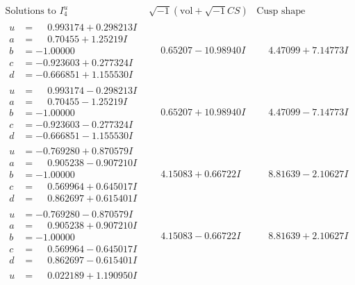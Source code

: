 \documentclass[1p]{elsarticle_modified}
\theoremstyle{definition}
\newcommand{\I}{\sqrt{-1}}
\begin{document}
$$\begin{array}{c|c|c}  
\text{Solutions to }I^u_{4}& \I (\text{vol} + \sqrt{-1}CS) & \text{Cusp shape}\\
 \hline 
\begin{aligned}
u &= \phantom{-}0.993174 + 0.298213 I \\
a &= \phantom{-}0.70455 + 1.25219 I \\
b &= -1.00000\phantom{ +0.000000I} \\
c &= -0.923603 + 0.277324 I \\
d &= -0.666851 + 1.155530 I\end{aligned}
 & \phantom{-}0.65207 - 10.98940 I & \phantom{-}4.47099 + 7.14773 I \\ \hline\begin{aligned}
u &= \phantom{-}0.993174 - 0.298213 I \\
a &= \phantom{-}0.70455 - 1.25219 I \\
b &= -1.00000\phantom{ +0.000000I} \\
c &= -0.923603 - 0.277324 I \\
d &= -0.666851 - 1.155530 I\end{aligned}
 & \phantom{-}0.65207 + 10.98940 I & \phantom{-}4.47099 - 7.14773 I \\ \hline\begin{aligned}
u &= -0.769280 + 0.870579 I \\
a &= \phantom{-}0.905238 - 0.907210 I \\
b &= -1.00000\phantom{ +0.000000I} \\
c &= \phantom{-}0.569964 + 0.645017 I \\
d &= \phantom{-}0.862697 + 0.615401 I\end{aligned}
 & \phantom{-}4.15083 + 0.66722 I & \phantom{-}8.81639 - 2.10627 I \\ \hline\begin{aligned}
u &= -0.769280 - 0.870579 I \\
a &= \phantom{-}0.905238 + 0.907210 I \\
b &= -1.00000\phantom{ +0.000000I} \\
c &= \phantom{-}0.569964 - 0.645017 I \\
d &= \phantom{-}0.862697 - 0.615401 I\end{aligned}
 & \phantom{-}4.15083 - 0.66722 I & \phantom{-}8.81639 + 2.10627 I \\ \hline\begin{aligned}
u &= \phantom{-}0.022189 + 1.190950 I \\

\end{aligned}
\end{array}$$
\end{document}
